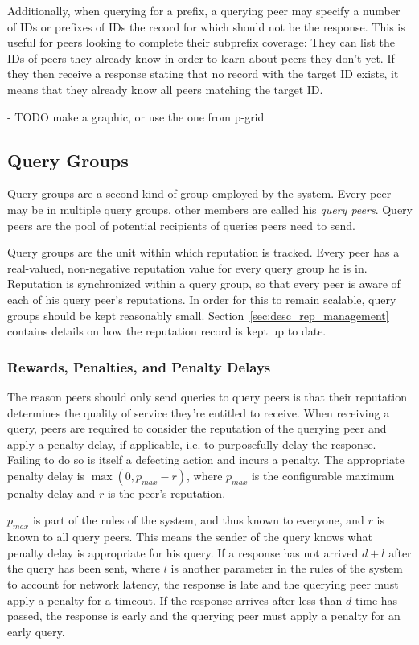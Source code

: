 Additionally, when querying for a prefix, a querying peer may specify a number
of IDs or prefixes of IDs the record for which should not be the response. This
is useful for peers looking to complete their subprefix coverage: They can list
the IDs of peers they already know in order to learn about peers they don't yet.
If they then receive a response stating that no record with the target ID
exists, it means that they already know all peers matching the target ID.

- TODO make a graphic, or use the one from p-grid

\subsection{Query Groups}
\label{sec:desc_query_groups}
Query groups are a second kind of group employed by the system. Every peer may
be in multiple query groups, other members are called his \emph{query peers}.
Query peers are the pool of potential recipients of queries peers need to send.

Query groups are the unit within which reputation is tracked. Every peer has a
real-valued, non-negative reputation value for every query group he is in.
Reputation is synchronized within a query group, so that every peer is aware of
each of his query peer's reputations. In order for this to remain scalable,
query groups should be kept reasonably small.
Section~\ref{sec:desc_rep_management} contains details on how the reputation
record is kept up to date.

\subsubsection{Rewards, Penalties, and Penalty Delays}
The reason peers should only send queries to query peers is that their
reputation determines the quality of service they're entitled to receive. When
receiving a query, peers are required to consider the reputation of the querying
peer and apply a penalty delay, if applicable, i.e. to purposefully delay the
response. Failing to do so is itself a defecting action and incurs a penalty.
The appropriate penalty delay is $\max(0, p_{max} - r)$, where $p_{max}$ is the
configurable maximum penalty delay and $r$ is the peer's reputation.

$p_{max}$ is part of the rules of the system, and thus known to everyone, and
$r$ is known to all query peers. This means the sender of the query knows what
penalty delay is appropriate for his query. If a response has not arrived $d +
l$ after the query has been sent, where $l$ is another parameter in the rules of
the system to account for network latency, the response is late and the querying
peer must apply a penalty for a timeout. If the response arrives after less than
$d$ time has passed, the response is early and the querying peer must apply a
penalty for an early query.

